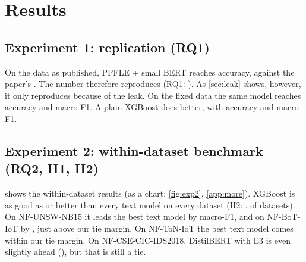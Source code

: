 \section{Results}\label{sec:results}

\subsection{Experiment 1: replication (RQ1)}
\begin{table}[!tbp]
  \centering
  \caption{Edge-IIoTset, test set: data as published vs.\ with the placeholder spelling unified (``--'': not run).}
  \label{tab:exp1}
\end{table}
On the data as published, PPFLE + small BERT reaches
 accuracy, against the paper's
. The number therefore reproduces (RQ1: ).
As \cref{sec:leak} shows, however, it only reproduces because of the leak. On the fixed data the same model reaches
 accuracy and
 macro-F1. A plain XGBoost does better, with
 accuracy and
 macro-F1.

\subsection{Experiment 2: within-dataset benchmark (RQ2, H1, H2)}
\begin{table}[!tbp]
  \centering
  \caption{Test macro-F1 (multiclass), mean $\pm$ std over  seeds.}
  \label{tab:exp2}
\end{table}
 shows the within-dataset results (as a chart: \cref{fig:exp2}, \cref{app:more}). XGBoost is as good as or better than every text model on
every dataset (H2: ,  of  datasets). On NF-UNSW-NB15 it leads
the best text model by 
macro-F1, and on NF-BoT-IoT by
, just above our tie
margin. On NF-ToN-IoT the best
text model comes within our tie margin. On NF-CSE-CIC-IDS2018, DistilBERT with E3 is even slightly ahead
(), but
that is still a tie.


